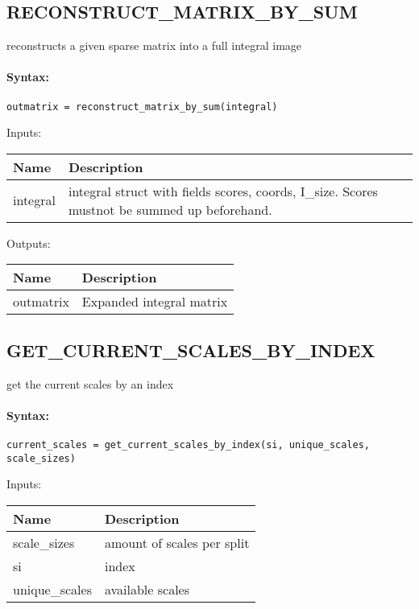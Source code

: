 \subsection{RECONSTRUCT\_MATRIX\_BY\_SUM}

reconstructs a given sparse matrix into a full integral image

\paragraph{Syntax:} \verb|outmatrix = reconstruct_matrix_by_sum(integral)|

\bigskip
Inputs:

\begin{tabular}{|p{}|p{}|}
\hline
\textbf{Name} & \textbf{Description} \\
\hline \hline
integral & integral struct with fields scores, coords, I\_size. Scores mustnot be summed up beforehand.  \\ \hline
\end{tabular}

\bigskip
Outputs:

\begin{tabular}{|p{}|p{}|}
\hline
\textbf{Name} & \textbf{Description} \\
\hline \hline
outmatrix & Expanded integral matrix  \\ \hline
\end{tabular}

\subsection{GET\_CURRENT\_SCALES\_BY\_INDEX}

get the current scales by an index

\paragraph{Syntax:} \verb|current_scales = get_current_scales_by_index(si, unique_scales, scale_sizes)|

\bigskip
Inputs:

\begin{tabular}{|p{}|p{}|}
\hline
\textbf{Name} & \textbf{Description} \\
\hline \hline
scale\_sizes & amount of scales per split  \\ \hline
si & index  \\ \hline
unique\_scales & available scales  \\ \hline
\end{tabular}

